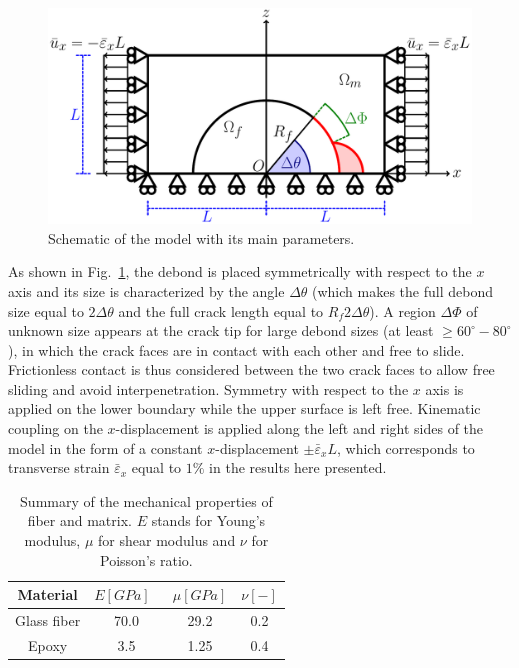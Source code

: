 \documentclass[review]{elsarticle}
\begin{document}
\begin{figure}[!h]
\centering
\includegraphics[width=\textwidth]{RUC.pdf}
\caption{Schematic of the model with its main parameters.}\label{fig:modelschem}
\end{figure}

As shown in Fig.~\ref{fig:modelschem}, the debond is placed symmetrically with respect to the $x$ axis and its size is characterized by the angle $\Delta\theta$ (which makes the full debond size equal to $2\Delta\theta$ and the full crack length equal to $R_{f}2{\Delta\theta}$). A region $\Delta\Phi$ of unknown size appears at the crack tip for large debond sizes (at least $\geq 60^{\circ}-80^{\circ}$), in which the crack faces are in contact with each other and free to slide. Frictionless contact is thus considered between the two crack faces to allow free sliding and avoid interpenetration. Symmetry with respect to the $x$ axis is applied on the lower boundary while the upper surface is left free. Kinematic coupling on the $x$-displacement is applied along the left and right sides of the model in the form of a constant $x$-displacement $\pm\bar{\varepsilon}_{x} L$, which corresponds to transverse strain $\bar{\varepsilon}_{x}$ equal to $1\%$ in the results here presented.

\begin{table}[!htbp]
 \centering
 \caption{Summary of the mechanical properties of fiber and matrix. $E$ stands for Young's modulus, $\mu$ for shear modulus and $\nu$ for Poisson's ratio.}
 \begin{tabular}{cccc}
\textbf{Material} & \textbf{$E\left[GPa\right]$}\ & \textbf{$\mu\left[GPa\right]$} & \textbf{$\nu\left[-\right]$} \\
\midrule
Glass fiber    & 70.0  & 29.2   & 0.2  \\
Epoxy    & 3.5    & 1.25   & 0.4
\end{tabular}
\label{tab:phaseprop}
\end{table}
\end{document}
